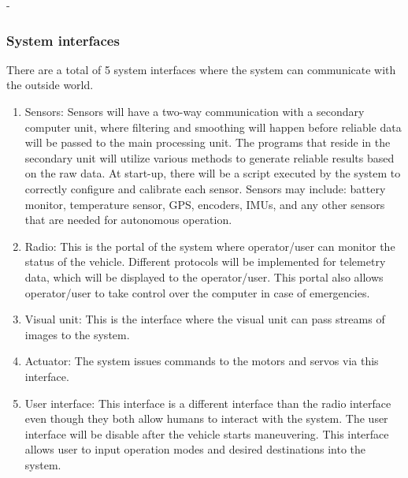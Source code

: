 -\documentclass[compsoc,draftclsnofoot,onecolumn,10pt]{IEEEtran}
\begin{document}
%

\subsubsection{System interfaces} %
There are a total of 5 system interfaces where the system can communicate with 
the outside world.
\begin{enumerate}
	\item Sensors: Sensors will have a two-way communication with a secondary computer unit, where filtering and smoothing will happen before reliable data will be passed to the main processing unit. 
	The programs that reside in the secondary unit will utilize various methods to generate reliable results based on the raw data. 
	At start-up, there will be a script executed by the system to correctly configure and calibrate each sensor. 
	Sensors may include: battery monitor, temperature sensor, GPS, encoders, IMUs, and any other sensors that are needed for autonomous operation.
	\item Radio: This is the portal of the system where operator/user can monitor the status of the vehicle. 
	Different protocols will be implemented for telemetry data, which will be displayed to the operator/user. 
	This portal also allows operator/user to take control over the computer in case of emergencies. 
	\item Visual unit: This is the interface where the visual unit can pass streams of images to the system.
	\item Actuator: The system issues commands to the motors and servos via this interface. 
	\item User interface: This interface is a different interface than the radio interface even though they both allow humans to interact with the system. 
	The user interface will be disable after the vehicle starts maneuvering. 
	This interface allows user to input operation modes and desired destinations into the system.
\end{enumerate}
\end{document}

